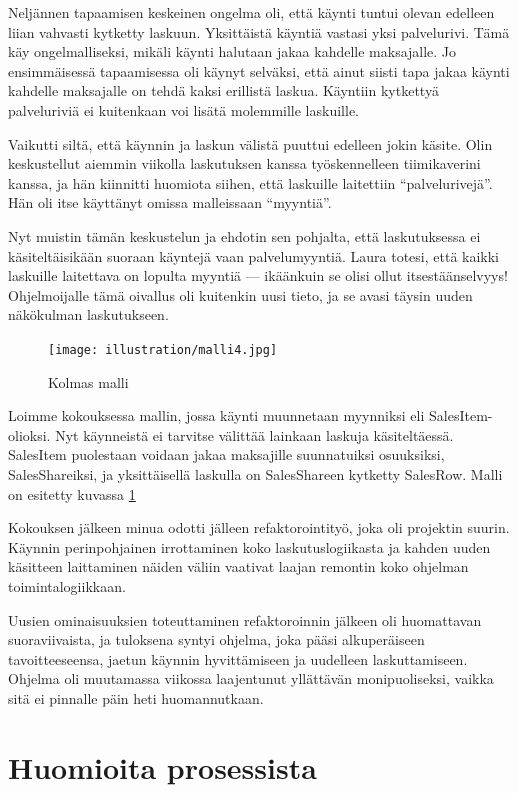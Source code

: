 Neljännen tapaamisen keskeinen ongelma oli, että käynti tuntui olevan
edelleen liian vahvasti kytketty laskuun. Yksittäistä käyntiä vastasi
yksi palvelurivi. Tämä käy ongelmalliseksi, mikäli käynti halutaan jakaa
kahdelle maksajalle. Jo ensimmäisessä tapaamisessa oli käynyt selväksi,
että ainut siisti tapa jakaa käynti kahdelle maksajalle on tehdä kaksi
erillistä laskua. Käyntiin kytkettyä palveluriviä ei kuitenkaan voi
lisätä molemmille laskuille.

Vaikutti siltä, että käynnin ja laskun välistä puuttui edelleen jokin
käsite. Olin keskustellut aiemmin viikolla laskutuksen kanssa
työskennelleen tiimikaverini kanssa, ja hän kiinnitti huomiota siihen,
että laskuille laitettiin ``palvelurivejä''. Hän oli itse käyttänyt
omissa malleissaan ``myyntiä''.

Nyt muistin tämän keskustelun ja ehdotin sen pohjalta, että
laskutuksessa ei käsiteltäisikään suoraan käyntejä vaan palvelumyyntiä.
Laura totesi, että kaikki laskuille laitettava on lopulta myyntiä ---
ikäänkuin se olisi ollut itsestäänselvyys! Ohjelmoijalle tämä oivallus
oli kuitenkin uusi tieto, ja se avasi täysin uuden näkökulman
laskutukseen.

\begin{figure}
\centering
\texttt{[image: illustration/malli4.jpg]}
\caption{\label{malli3}Kolmas malli}
\end{figure}

Loimme kokouksessa mallin, jossa käynti muunnetaan myynniksi eli
SalesItem-olioksi. Nyt käynneistä ei tarvitse välittää lainkaan laskuja
käsiteltäessä. SalesItem puolestaan voidaan jakaa maksajille
suunnatuiksi osuuksiksi, SalesShareiksi, ja yksittäisellä laskulla on
SalesShareen kytketty SalesRow. Malli on esitetty kuvassa \ref{malli3}

Kokouksen jälkeen minua odotti jälleen refaktorointityö, joka oli
projektin suurin. Käynnin perinpohjainen irrottaminen koko
laskutuslogiikasta ja kahden uuden käsitteen laittaminen näiden väliin
vaativat laajan remontin koko ohjelman toimintalogiikkaan.

Uusien ominaisuuksien toteuttaminen refaktoroinnin jälkeen oli
huomattavan suoraviivaista, ja tuloksena syntyi ohjelma, joka pääsi
alkuperäiseen tavoitteeseensa, jaetun käynnin hyvittämiseen ja uudelleen
laskuttamiseen. Ohjelma oli muutamassa viikossa laajentunut yllättävän
monipuoliseksi, vaikka sitä ei pinnalle päin heti huomannutkaan.

\hypertarget{huomioita-prosessista}{%
\section{Huomioita prosessista}\label{huomioita-prosessista}}

